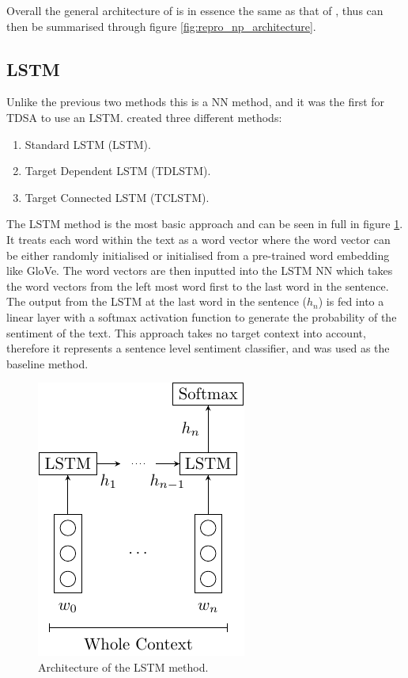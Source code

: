 Overall the general architecture of \citet{wang-etal-2017-tdparse} is in essence the same as that of \citet{vo2015target}, thus can then be summarised through figure \ref{fig:repro_np_architecture}. 

\FloatBarrier
\subsection{LSTM}
\label{section:repro_lstm_description}

Unlike the previous two methods this is a NN method, and it was the first for TDSA to use an LSTM. \citet{tang-etal-2016-effective} created three different methods: 

\begin{enumerate}
    \item Standard LSTM (LSTM).
    \item Target Dependent LSTM (TDLSTM).
    \item Target Connected LSTM (TCLSTM).
\end{enumerate}

The LSTM method is the most basic approach and can be seen in full in figure \ref{fig:repro_lstm_method}. It treats each word within the text as a word vector where the word vector can be either randomly initialised or initialised from a pre-trained word embedding like GloVe. The word vectors are then inputted into the LSTM NN which takes the word vectors from the left most word first to the last word in the sentence. The output from the LSTM at the last word in the sentence ($h_n$) is fed into a linear layer with a softmax activation function to generate the probability of the sentiment of the text. This approach takes no target context into account, therefore it represents a sentence level sentiment classifier, and was used as the baseline method.

\begin{figure}[!h]
    \centering
    \includegraphics{Diagrams/Reproducibility/tang_lstm.pdf}
    \caption{Architecture of the LSTM method.}
    \label{fig:repro_lstm_method}
\end{figure}

